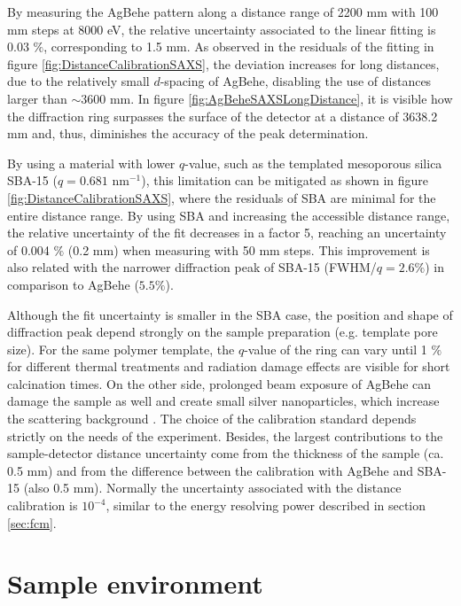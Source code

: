 By measuring the AgBehe pattern along a distance range of 2200 mm with 100 mm steps at 8000 eV, the relative uncertainty associated to the linear fitting is 0.03 $\%$, corresponding to 1.5 mm. As observed in the residuals of the fitting in figure \ref{fig:DistanceCalibrationSAXS}, the deviation increases for long distances, due to the relatively small $d$-spacing of AgBehe, disabling the use of distances larger than $\sim 3600$ mm. In figure \ref{fig:AgBeheSAXSLongDistance}, it is visible how the diffraction ring surpasses the surface of the detector at a distance of 3638.2 mm and, thus, diminishes the accuracy of the peak determination.

By using a material with lower $q$-value, such as the templated mesoporous silica SBA-15 \citep{zhao_triblock_1998} ($q=0.681$ nm$^{-1}$), this limitation can be mitigated as shown in figure \ref{fig:DistanceCalibrationSAXS}, where the residuals of SBA are minimal for the entire distance range. By using SBA and increasing the accessible distance range, the relative uncertainty of the fit decreases in a factor 5, reaching an uncertainty of 0.004 $\%$ (0.2 mm) when measuring with 50 mm steps. This improvement is also related with the narrower diffraction peak of SBA-15 (FWHM/$q=2.6\%$) in comparison to AgBehe ($5.5\%$).

Although the fit uncertainty is smaller in the SBA case, the position and shape of diffraction peak depend strongly on the sample preparation (e.g. template pore size). For the same polymer template, the $q$-value of the ring can vary until 1 $\%$ for different thermal treatments and radiation damage effects are visible for short calcination times. On the other side, prolonged beam exposure of AgBehe can damage the sample as well and create small silver nanoparticles, which increase the scattering background \cite{liu_thermal_2006}. The choice of the calibration standard depends strictly on the needs of the experiment. Besides, the largest contributions to the sample-detector distance uncertainty come from the thickness of the sample (ca. 0.5 mm) and from the difference between the calibration with AgBehe and SBA-15 (also 0.5 mm). Normally the uncertainty associated with the distance calibration is $10^{-4}$, similar to the energy resolving power described in section \ref{sec:fcm}.

\section{Sample environment}

